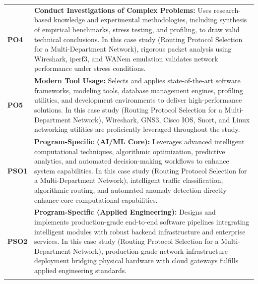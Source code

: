 {\begin{longtable}{@{}>{\centering\arraybackslash}p{1.8cm} p{13.2cm}@{}}
    \addlinespace
\textbf{PO4} & \textbf{Conduct Investigations of Complex Problems:} Uses research-based knowledge and experimental methodologies, including synthesis of empirical benchmarks, stress testing, and profiling, to draw valid technical conclusions. In this case study (Routing Protocol Selection for a Multi-Department Network), rigorous packet analysis using Wireshark, iperf3, and WANem emulation validates network performance under stress conditions. \\
    \addlinespace
\textbf{PO5} & \textbf{Modern Tool Usage:} Selects and applies state-of-the-art software frameworks, modeling tools, database management engines, profiling utilities, and development environments to deliver high-performance solutions. In this case study (Routing Protocol Selection for a Multi-Department Network), Wireshark, GNS3, Cisco IOS, Snort, and Linux networking utilities are proficiently leveraged throughout the study. \\
    \addlinespace
\textbf{PSO1} & \textbf{Program-Specific (AI/ML Core):} Leverages advanced intelligent computational techniques, algorithmic optimization, predictive analytics, and automated decision-making workflows to enhance system capabilities. In this case study (Routing Protocol Selection for a Multi-Department Network), intelligent traffic classification, algorithmic routing, and automated anomaly detection directly enhance core computational capabilities. \\
    \addlinespace
\textbf{PSO2} & \textbf{Program-Specific (Applied Engineering):} Designs and implements production-grade end-to-end software pipelines integrating intelligent modules with robust backend infrastructure and enterprise services. In this case study (Routing Protocol Selection for a Multi-Department Network), production-grade network infrastructure deployment bridging physical hardware with cloud gateways fulfills applied engineering standards. \\
    \addlinespace
    \bottomrule
\end{longtable}}
